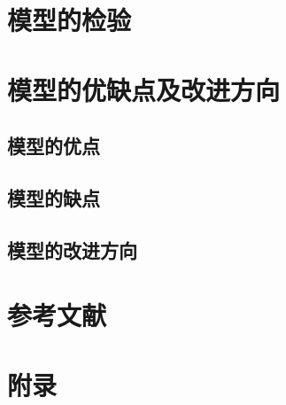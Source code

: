 \documentclass[UTF8]{ctexart}
\begin{document}
\section{模型的检验}
\section{模型的优缺点及改进方向}
\subsection{模型的优点}
\subsection{模型的缺点}
\subsection{模型的改进方向}
\section{参考文献}
\section{附录}
\end{document}
